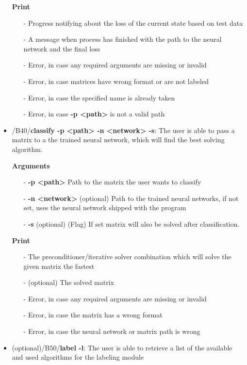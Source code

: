 \documentclass[parskip=full]{scrartcl}
\begin{document}
\begin{itemize}
\textbf{Print}
	\begin{itemize}
	\item[-]Progress notifying about the loss of the current state based on test data
	\item[-]A message when process has finished with the path to the \gls{neural network} and the final loss
	\item[-]Error, in case any required arguments are missing or invalid
	\item[-]Error, in case matrices have wrong format or are not labeled
	\item[-]Error, in case the specified name is already taken
	\item[-]Error, in case \textbf{-p <path>} is not a valid path
	\end{itemize}

\item/B40/\textbf{classify -p <path> -n <network> -s}:
\newline The user is able to pass a matrix to a the trained \gls{neural network}, which will find the best solving \gls{algorithm}.

\textbf{Arguments}
	\begin{itemize}
	\item[-]\textbf{-p <path>} Path to the matrix the user wants to classify
	\item[-]\textbf{-n <network>} (optional) Path to the trained \glspl{neural network}, if not set, uses the \gls{neural network} shipped with the program
	\item[-]\textbf{-s} (optional) (Flag) If set matrix will also be solved after classification.
	\end{itemize}

\textbf{Print}
	\begin{itemize}
	\item[-]The \gls{preconditioner}/\gls{iterative solver} combination which will solve the given matrix the fastest
	\item[-](optional) The solved matrix
	\item[-]Error, in case any required arguments are missing or invalid
	\item[-]Error, in case the matrix has a wrong format
	\item[-]Error, in case the \gls{neural network} or matrix path is wrong
	\end{itemize}

\item(optional)/B50/\textbf{label -l}:
\newline The user is able to retrieve a list of the available and used algorithms for the labeling module


\end{itemize}
\end{document}
